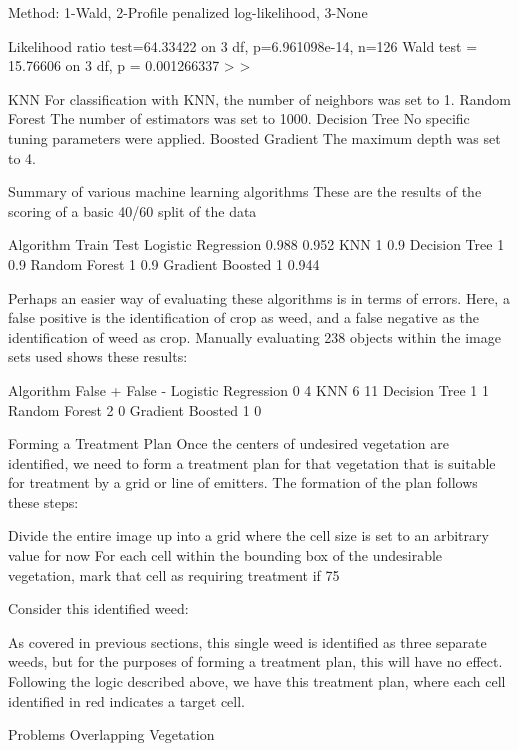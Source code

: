 \documentclass[letterpaper]{article}
\begin{document}
Method: 1-Wald, 2-Profile penalized log-likelihood, 3-None

Likelihood ratio test=64.33422 on 3 df, p=6.961098e-14, n=126
Wald test = 15.76606 on 3 df, p = 0.001266337
> 
> 




KNN
For classification with KNN, the number of neighbors was set to 1.
Random Forest
The number of estimators was set to 1000.
Decision Tree
No specific tuning parameters were applied.
Boosted Gradient
The maximum depth was set to 4.

Summary of various machine learning algorithms
These are the results of the scoring of a basic 40/60 split of the data

Algorithm
Train
Test
Logistic Regression
0.988
0.952
KNN
1
0.9
Decision Tree
1
0.9
Random Forest
1
0.9
Gradient Boosted
1
0.944


Perhaps an easier way of evaluating these algorithms is in terms of errors.  Here, a false positive is the identification of crop as weed, and a false negative as the identification of weed as crop.   Manually evaluating 238 objects within the image sets used shows these results:


Algorithm
False +
False -
Logistic Regression
0
4
KNN
6
11
Decision Tree
1
1
Random Forest
2
0
Gradient Boosted
1
0


Forming a Treatment Plan
Once the centers of undesired vegetation are identified, we need to form a treatment plan for that vegetation that is suitable for treatment by a grid or line of emitters. The formation of the plan follows these steps:

Divide the entire image up into a grid where the cell size is set to an arbitrary value for now
For each cell within the bounding box of the undesirable vegetation, mark that cell as requiring treatment if 75%

Consider this identified weed:



As covered in previous sections, this single weed is identified as three separate weeds, but for the purposes of forming a treatment plan, this will have no effect. Following the logic described above, we have this treatment plan, where each cell identified in red indicates a target cell.




Problems
Overlapping Vegetation
\end{document}
